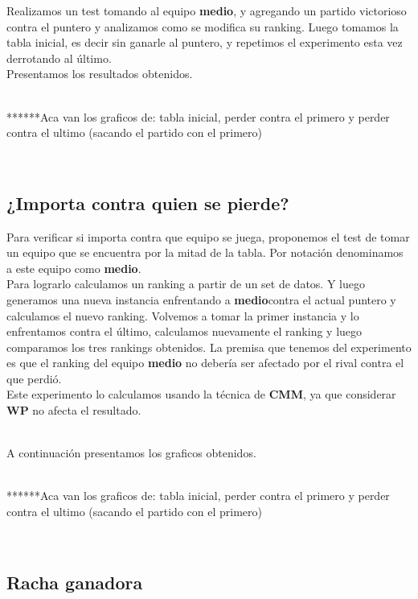 Realizamos un test tomando al equipo \textbf{medio}, y agregando un partido victorioso contra el puntero y analizamos como se modifica su ranking. Luego tomamos la tabla inicial, es decir sin ganarle al puntero, y repetimos el experimento esta vez derrotando al último. \\

Presentamos los resultados obtenidos.

\\


******Aca van los graficos de: tabla inicial, perder contra el primero y perder contra el ultimo (sacando el partido con el primero)

\\




\subsection{¿Importa contra quien se pierde?}

Para verificar si importa contra que equipo se juega, proponemos el test de tomar un equipo que se encuentra por la mitad de la tabla. Por notación denominamos a este equipo como \textbf{medio}. \\

Para lograrlo calculamos un ranking a partir de un set de datos. Y luego generamos una nueva instancia enfrentando a \textbf{medio}contra el actual puntero y calculamos el nuevo ranking. Volvemos a tomar la primer instancia y lo enfrentamos contra el último, calculamos nuevamente el ranking y luego comparamos los tres rankings obtenidos. La premisa que tenemos del experimento es que el ranking del equipo \textbf{medio} no debería ser afectado por el rival contra el que perdió.\\

Este experimento lo calculamos usando la técnica de \textbf{CMM}, ya que considerar \textbf{WP} no afecta el resultado.

\\
A continuación presentamos los graficos obtenidos.

\\


******Aca van los graficos de: tabla inicial, perder contra el primero y perder contra el ultimo (sacando el partido con el primero)

\\



\subsection{Racha ganadora}

